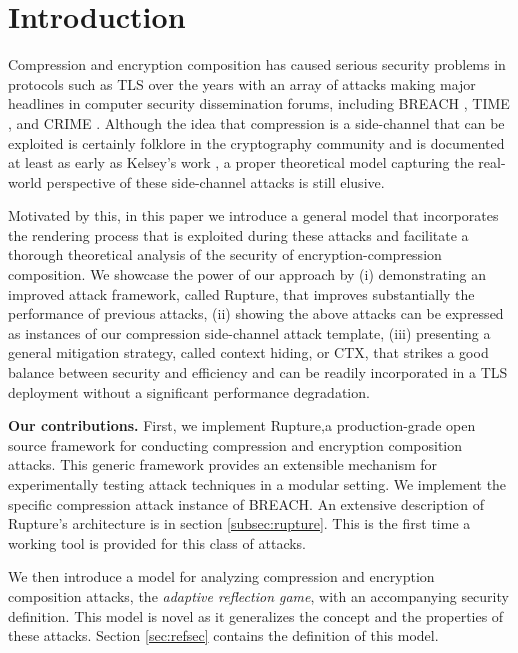 \section{Introduction}\label{sec:prev}

Compression and encryption composition has caused serious security problems in
protocols such as TLS \cite{dierks2008tls} over the years with an array of
attacks making major headlines in computer security dissemination forums,
including BREACH \cite{gluck2013breach}, TIME \cite{be2013perfect}, and CRIME
\cite{duong2012crime}. Although the idea that compression is a side-channel that
can be exploited is certainly folklore in the cryptography community and is
documented at least as early as Kelsey's work \cite{kelsey2002compression}, a
proper theoretical model capturing the real-world perspective of these
side-channel attacks is still elusive.

Motivated by this, in this paper we introduce a general model that incorporates
the rendering process that is exploited during these attacks and facilitate a
thorough theoretical analysis of the security of encryption-compression
composition. We showcase the power of our approach by (i) demonstrating an
improved attack framework, called Rupture, that improves substantially the
performance of previous attacks, (ii) showing the above attacks can be expressed
as instances of our compression side-channel attack template, (iii) presenting a
general mitigation strategy, called context hiding, or CTX, that strikes a good balance between
security and efficiency and can be readily incorporated in a TLS deployment
without a significant performance degradation.


\noindent
\textbf{Our contributions.} First, we implement Rupture,\footnotemark[1] a
production-grade open source framework for conducting compression and encryption
composition attacks. This generic framework provides an extensible mechanism
for experimentally testing attack techniques in a modular setting. We implement
the specific compression attack instance of BREACH. An extensive
description of Rupture's architecture is in section \ref{subsec:rupture}.
This is the first time a working tool is provided for this class of attacks.

We then introduce a model for analyzing compression and encryption composition
attacks, the \textit{adaptive reflection game}, with an accompanying security
definition. This model is novel as it generalizes the concept and the properties
of these attacks. Section \ref{sec:refsec} contains the definition of this
model.

